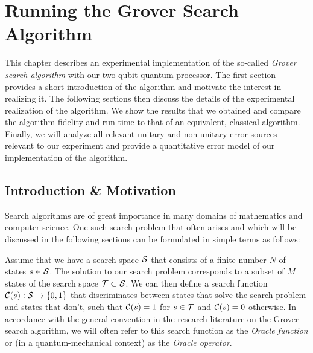 
\chapter{Running the Grover Search Algorithm} \label{chapter:grover_algorithm}

This chapter describes an experimental implementation of the so-called {\it Grover search algorithm} with our two-qubit quantum processor. The first section provides a short introduction of the algorithm and motivate the interest in realizing it. The following sections then discuss the details of the experimental realization of the algorithm. We show the results that we obtained and compare the algorithm fidelity and run time to that of an equivalent, classical algorithm. Finally, we will analyze all relevant unitary and non-unitary error sources relevant to our experiment and provide a quantitative error model of our implementation of the algorithm.

\section{Introduction \& Motivation}

Search algorithms are of great importance in many domains of mathematics and computer science. One such search problem that often arises and which will be discussed in the following sections can be formulated in simple terms as follows:

\smallskip

Assume that we have a search space $\begin{mathcal}S\end{mathcal}$ that consists of a finite number $N$ of states $s \in \begin{mathcal}S\end{mathcal}$. The solution to our search problem corresponds to a subset of $M$ states of the search space $\begin{mathcal}T\end{mathcal} \subset \begin{mathcal}S\end{mathcal}$. We can then define a search function $\Or(s):\begin{mathcal}S\end{mathcal}\to \{0,1\}$ that discriminates between states that solve the search problem and states that don't, such that $\Or(s) = 1$ for $s \in \begin{mathcal}T\end{mathcal}$ and $\Or(s) = 0$ otherwise. In accordance with the general convention in the research literature on the Grover search algorithm, we will  often refer to this search function as the {\it Oracle function} or (in a quantum-mechanical context) as the {\it Oracle operator}.

